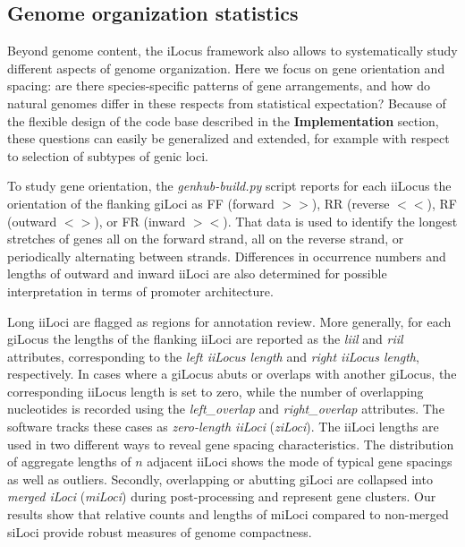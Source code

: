 \subsection{Genome organization statistics}
Beyond genome content, the iLocus framework also allows to systematically study different aspects of genome organization.
Here we focus on gene orientation and spacing: are there species-specific patterns of gene arrangements, and how do natural genomes differ in these respects from statistical expectation?
Because of the flexible design of the code base described in the \textbf{Implementation} section, these questions can easily be generalized and extended, for example with respect to selection of subtypes of genic loci.

To study gene orientation, the \textit{genhub-build.py} script reports for each iiLocus the orientation of the flanking giLoci as FF (forward $>>$), RR (reverse $<<$), RF (outward $<>$), or FR (inward $><$).
That data is used to identify the longest stretches of genes all on the forward strand, all on the reverse strand, or periodically alternating between strands.
Differences in occurrence numbers and lengths of outward and inward iiLoci are also determined for possible interpretation in terms of promoter architecture.

Long iiLoci are flagged as regions for annotation review.
More generally, for each giLocus the lengths of the flanking iiLoci are reported as the \textit{liil} and \textit{riil} attributes, corresponding to the \textit{left iiLocus length} and \textit{right iiLocus length}, respectively.
In cases where a giLocus abuts or overlaps with another giLocus, the corresponding iiLocus length is set to zero, while the number of overlapping nucleotides is recorded using the \textit{left\_overlap} and \textit{right\_overlap} attributes.
The software tracks these cases as \textit{zero-length iiLoci} (\textit{ziLoci}).
The iiLoci lengths are used in two different ways to reveal gene spacing characteristics.
The distribution of aggregate lengths of $n$ adjacent iiLoci shows the mode of typical gene spacings as well as outliers.
Secondly, overlapping or abutting giLoci are collapsed into \textit{merged iLoci} (\textit{miLoci}) during post-processing and represent gene clusters.
Our results show that relative counts and lengths of miLoci compared to non-merged siLoci provide robust measures of genome compactness.

